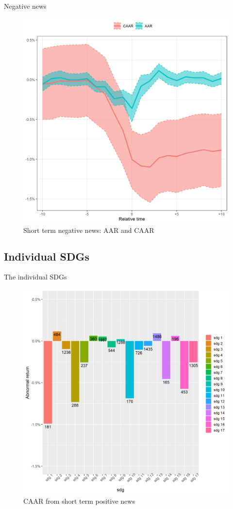 Negative news
\begin{figure} [H]
    \centering
    \includegraphics[scale=0.6]{Projekt/1.Figures analysis/ST_negative_all_CI.png}
    \caption{Short term negative news: AAR and CAAR}
    \label{fig:ST_pos_news}
\end{figure}


\subsection{Individual SDGs}

The individual SDGs
\begin{figure} [H]
    \centering
    \includegraphics[scale=0.6]{Projekt/1.Figures analysis/ST_positive_sdg_bar.png}
    \caption{CAAR from short term positive news}
    \label{fig:ST_pos_news}
\end{figure}

